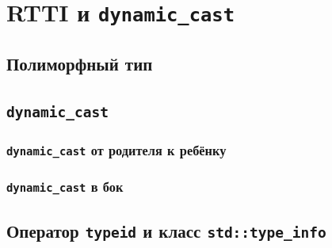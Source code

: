 \documentclass{article}
\begin{document}
\newpage
\section{RTTI и \texttt{dynamic\_cast}}
\subsection*{Полиморфный тип}
\subsection*{\texttt{dynamic\_cast}}

\subsubsection*{\texttt{dynamic\_cast} от родителя к ребёнку}
\subsubsection*{\texttt{dynamic\_cast} в бок}

\subsection*{Оператор \texttt{typeid} и класс \texttt{std::type\_info}}
\end{document}
